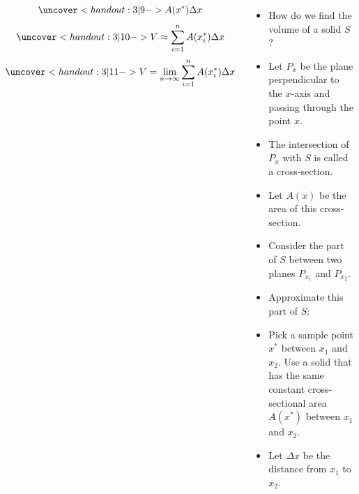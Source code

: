 \begin{frame}
\begin{columns}[c]
{}%
%
%

\abovedisplayskip=1pt
\belowdisplayskip=1pt
\[
\uncover<handout:3| 9->{A(x^*)\Delta x}%
\]
\abovedisplayskip=1pt
\belowdisplayskip=1pt
\[
\uncover<handout:3| 10->{V \approx \sum_{i=1}^n A(x_i^*)\Delta x}%
\]
\abovedisplayskip=1pt
\belowdisplayskip=1pt
\[
\uncover<handout:3| 11->{V = \lim_{n\to\infty}\sum_{i=1}^n A(x_i^*)\Delta x}%
\]
\begin{itemize}
\item  How do we find the volume of a solid $S$?
\item<handout:2-| 2->  Let $P_x$ be the plane perpendicular to the $x$-axis and passing through the point $x$.
\item<handout:2-| 2->  The intersection of $P_x$ with $S$ is called a cross-section.
\item<handout:2-| 2->  Let $A(x)$ be the area of this cross-section.
\item<handout:3| 6->  Consider the part of $S$ between two planes $P_{x_1}$ and $P_{x_2}$.
\item<handout:3| 7->  Approximate this part of $S$:
\item<handout:3| 7->  Pick a sample point $x^*$ between $x_1$ and $x_2$.  Use a solid that has the same constant cross-sectional area $A(x^*)$ between $x_1$ and $x_2$.
\item<handout:3| 8->  Let $\Delta x$ be the distance from $x_1$ to $x_2$.
\end{itemize}
\end{columns}
\end{frame}
